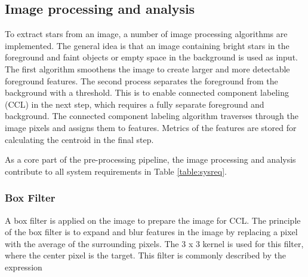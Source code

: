 \documentclass[12pt]{report}
\begin{document}
\subsection{Image processing and analysis}
To extract stars from an image, a number of image processing algorithms are implemented. The general idea is that an image containing bright stars in the foreground and faint objects or empty space in the background is used as input. The first algorithm smoothens the image to create larger and more detectable foreground features. The second process separates the foreground from the background with a threshold. This is to enable connected component labeling (CCL) in the next step, which requires a fully separate foreground and background. The connected component labeling algorithm traverses through the image pixels and assigns them to features. Metrics of the features are stored for calculating the centroid in the final step. \citep{stpp}
\par
As a core part of the pre-processing pipeline, the image processing and analysis contribute to all system requirements in Table \ref*{table:sysreq}.

\subsubsection{Box Filter}
A box filter is applied on the image to prepare the image for CCL. The principle of the box filter is to expand and blur features in the image by replacing a pixel with the average of the surrounding pixels. The 3 x 3 kernel is used for this filter, where the center pixel is the target. This filter is commonly described by the expression 
 
\end{document}
